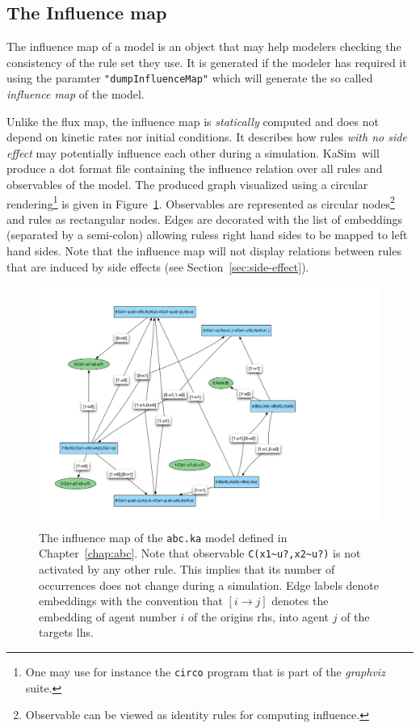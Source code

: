 \documentclass[11pt]{book}
\def\KaSim{\textsf{KaSim}}
\def\int{\hbox{\texttt{\~}}}
\def\ttt#1{\texttt{#1}}
\def\rar{\rightarrow}
\begin{document}
\subsection{The Influence map}
The influence map of a model is an object that may help modelers checking the consistency of the rule set they use. It is generated if the modeler has required it using the paramter \ttt{"dumpInfluenceMap"} which will generate the so called \emph{influence map} of the model.

Unlike the flux map, the influence map is \emph{statically} computed and does not depend on kinetic rates nor initial conditions. It describes how rules \emph{with no side effect} may potentially influence each other during a simulation. \KaSim~will produce a dot format file containing the influence relation over all rules and observables of the model. The produced graph visualized using a circular rendering\footnote{One may use for instance the \ttt{circo} program that is part of the \textit{graphviz} suite.} is given in Figure~\ref{fig:abc-im}. Observables are represented as circular nodes\footnote{Observable can be viewed as identity rules for computing influence.} and rules as rectangular nodes. Edges are decorated with the list of embeddings (separated by a semi-colon) allowing rules\textquotesingle s right hand sides to be mapped to left hand sides. Note that the influence map will not display relations between rules that are induced by side effects (see Section~\ref{sec:side-effect}).

\begin{figure}[htbp] %
   \centering
   \includegraphics[width=15cm]{img/abc-im.png} 
   \caption{The influence map of the \ttt{abc.ka} model defined in Chapter~\ref{chap:abc}. Note that observable \ttt{C(x1\int u?,x2\int u?)} is not activated by any other rule. This implies that its number of occurrences does not change during a simulation. Edge labels denote embeddings with the convention that $[i\rar j]$ denotes the embedding of agent number $i$ of the origin\textquotesingle s rhs, into agent $j$ of the target\textquotesingle s lhs.}
   \label{fig:abc-im}
\end{figure}
\end{document}
